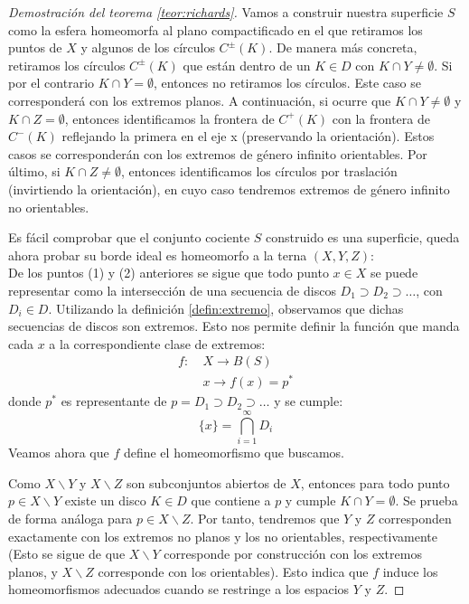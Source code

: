 \documentclass[a4paper,11pt,spanish, twoside, leqno]{tfg-uam}
\theoremstyle{definition}
\begin{document}
\begin{proof}[Demostración del teorema \ref{teor:richards}]
Vamos a construir nuestra superficie $S$ como la esfera homeomorfa al plano compactificado en el que retiramos los puntos de $X$ y algunos de los círculos $C^\pm(K)$. De manera más concreta, retiramos los círculos $C^\pm(K)$ que están dentro de un $K\in D$ con $K \cap Y \neq \emptyset$. Si por el contrario  $K \cap Y = \emptyset$, entonces no retiramos los círculos. Este caso se corresponderá con los extremos planos. A continuación,  si ocurre que $K \cap Y \neq \emptyset$  y $K \cap Z = \emptyset$, entonces identificamos la frontera de $C^+(K)$ con la frontera de $C^-(K)$ reflejando la primera en el eje x (preservando la orientación). Estos casos se corresponderán con los extremos de género infinito orientables.  Por último, si $K \cap Z \neq \emptyset$, entonces identificamos los círculos por traslación (invirtiendo la orientación), en cuyo caso tendremos extremos de género infinito no orientables.

Es fácil comprobar que el conjunto cociente $S$ construido es una superficie, queda ahora probar su borde ideal es homeomorfo a la terna $(X,Y,Z)$:\\
De los puntos (1) y (2) anteriores se sigue que todo punto $x\in X$ se puede representar como la intersección de una secuencia de discos $D_1 \supset D_2 \supset \ldots$, con $D_i \in D$. Utilizando la definición \ref{defin:extremo}, observamos que dichas secuencias de discos son extremos. Esto nos permite definir la función que manda cada $x$ a la correspondiente clase de extremos:
\begin{align*}
f:& \: X \longrightarrow  B(S)\\
& \: x \longrightarrow f(x) = p^*
\end{align*}
donde $p^*$ es representante de $p = D_1 \supset D_2 \supset \ldots $ y se cumple:
\[
\{x\} = \bigcap_{i = 1}^{\infty} D_i
\]
Veamos ahora que $f$ define el homeomorfismo que buscamos.

Como $X\backslash Y$ y $X\backslash Z$ son subconjuntos abiertos de $X$, entonces para todo punto $p\in X\backslash Y$ existe un disco $K\in D$ que contiene a $p$ y cumple $K \cap Y = \emptyset$. Se prueba de forma análoga para $p \in X\backslash Z$. Por tanto, tendremos que $Y$ y $Z$ corresponden exactamente con los extremos no planos y los no orientables, respectivamente (Esto se sigue de que $X\backslash Y$ corresponde por construcción con los extremos planos, y $X\backslash Z$ corresponde con los orientables). Esto indica que $f$ induce los homeomorfismos adecuados cuando se restringe a los espacios $Y$ y $Z$.


\end{proof}
\end{document}
